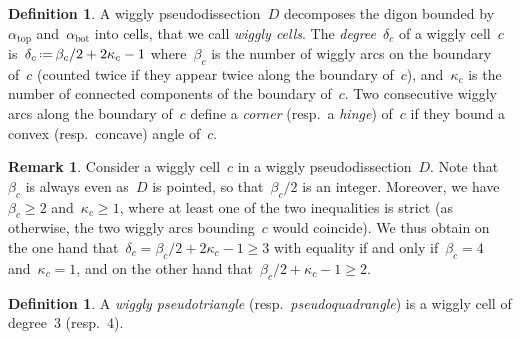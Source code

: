 \documentclass{amsart}
\theoremstyle{definition}
\newtheorem{definition}[theorem]{Definition}
\newtheorem{remark}[theorem]{Remark}
\newcommand{\eqdef}{\mbox{\,\raisebox{0.2ex}{\scriptsize\ensuremath{\mathrm:}}\ensuremath{=}\,}} %
\newcommand{\darkblue}{\color{darkblue}} %
\newcommand{\defn}[1]{\textsl{\darkblue #1}} %
\begin{document}
\begin{definition}
A wiggly pseudodissection~$D$ decomposes the digon bounded by~$\alpha_\mathrm{top}$ and~$\alpha_\mathrm{bot}$ into cells, that we call \defn{wiggly cells}.
The \defn{degree}~$\delta_c$ of a wiggly cell~$c$ is~$\delta_c \eqdef \beta_c/2+2\kappa_c-1$ where~$\beta_c$ is the number of wiggly arcs on the boundary of~$c$ (counted twice if they appear twice along the boundary of~$c$), and~$\kappa_c$ is the number of connected components of the boundary of~$c$.
Two consecutive wiggly arcs along the boundary of~$c$ define a \defn{corner} (resp.~a \defn{hinge}) of~$c$ if they bound a convex (resp.~concave) angle of~$c$.
\end{definition}

\begin{remark}
\label{rem:degree}
Consider a wiggly cell~$c$ in a wiggly pseudodissection~$D$.
Note that~$\beta_c$ is always even as~$D$ is pointed, so that~$\beta_c/2$ is an integer.
Moreover, we have~$\beta_c \ge 2$ and~$\kappa_c \ge 1$, where at least one of the two inequalities is strict (as otherwise, the two wiggly arcs bounding~$c$ would coincide).
We thus obtain on the one hand that~$\delta_c = \beta_c/2+2\kappa_c-1 \ge 3$ with equality if and only if~$\beta_c = 4$ and~$\kappa_c = 1$, and on the other hand that~$\beta_c/2+\kappa_c-1 \ge 2$.
\end{remark}

\begin{definition}
A \defn{wiggly pseudotriangle} (resp.~\defn{pseudoquadrangle}) is a wiggly cell of degree~$3$ (resp.~$4$).
\end{definition}
\end{document}
